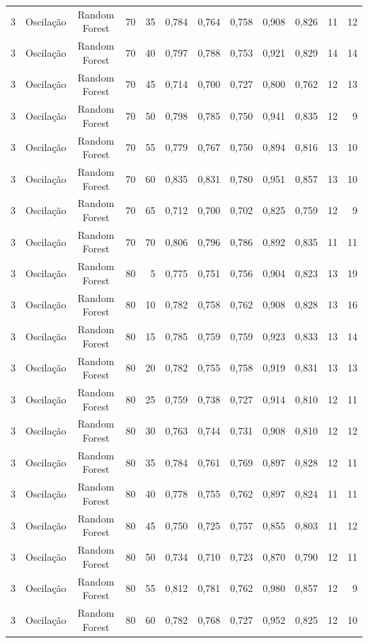 \begin{longtable}{ccclrrrrrrrr}
3 & Oscilação & Random Forest & 70 & 35 & 0,784 & 0,764 & 0,758 & 0,908 & 0,826 & 11 & 12 \\
3 & Oscilação & Random Forest & 70 & 40 & 0,797 & 0,788 & 0,753 & 0,921 & 0,829 & 14 & 14 \\
3 & Oscilação & Random Forest & 70 & 45 & 0,714 & 0,700 & 0,727 & 0,800 & 0,762 & 12 & 13 \\
3 & Oscilação & Random Forest & 70 & 50 & 0,798 & 0,785 & 0,750 & 0,941 & 0,835 & 12 & 9 \\
3 & Oscilação & Random Forest & 70 & 55 & 0,779 & 0,767 & 0,750 & 0,894 & 0,816 & 13 & 10 \\
3 & Oscilação & Random Forest & 70 & 60 & 0,835 & 0,831 & 0,780 & 0,951 & 0,857 & 13 & 10 \\
3 & Oscilação & Random Forest & 70 & 65 & 0,712 & 0,700 & 0,702 & 0,825 & 0,759 & 12 & 9 \\
3 & Oscilação & Random Forest & 70 & 70 & 0,806 & 0,796 & 0,786 & 0,892 & 0,835 & 11 & 11 \\
3 & Oscilação & Random Forest & 80 & 5 & 0,775 & 0,751 & 0,756 & 0,904 & 0,823 & 13 & 19 \\
3 & Oscilação & Random Forest & 80 & 10 & 0,782 & 0,758 & 0,762 & 0,908 & 0,828 & 13 & 16 \\
3 & Oscilação & Random Forest & 80 & 15 & 0,785 & 0,759 & 0,759 & 0,923 & 0,833 & 13 & 14 \\
3 & Oscilação & Random Forest & 80 & 20 & 0,782 & 0,755 & 0,758 & 0,919 & 0,831 & 13 & 13 \\
3 & Oscilação & Random Forest & 80 & 25 & 0,759 & 0,738 & 0,727 & 0,914 & 0,810 & 12 & 11 \\
3 & Oscilação & Random Forest & 80 & 30 & 0,763 & 0,744 & 0,731 & 0,908 & 0,810 & 12 & 12 \\
3 & Oscilação & Random Forest & 80 & 35 & 0,784 & 0,761 & 0,769 & 0,897 & 0,828 & 12 & 11 \\
3 & Oscilação & Random Forest & 80 & 40 & 0,778 & 0,755 & 0,762 & 0,897 & 0,824 & 11 & 11 \\
3 & Oscilação & Random Forest & 80 & 45 & 0,750 & 0,725 & 0,757 & 0,855 & 0,803 & 11 & 12 \\
3 & Oscilação & Random Forest & 80 & 50 & 0,734 & 0,710 & 0,723 & 0,870 & 0,790 & 12 & 11 \\
3 & Oscilação & Random Forest & 80 & 55 & 0,812 & 0,781 & 0,762 & 0,980 & 0,857 & 12 & 9 \\
3 & Oscilação & Random Forest & 80 & 60 & 0,782 & 0,768 & 0,727 & 0,952 & 0,825 & 12 & 10 \\

\end{longtable}
